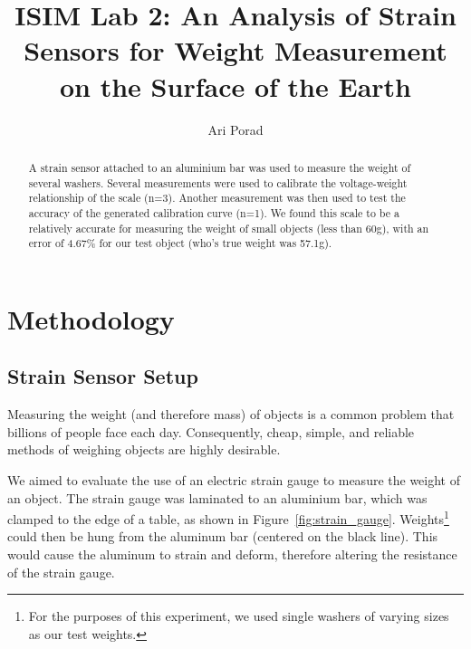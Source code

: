 \documentclass[11pt]{article}
\begin{document}
\title{ISIM Lab 2: An Analysis of Strain Sensors for Weight Measurement on the Surface of the Earth}
\author{Ari Porad}
\maketitle %

\begin{abstract}
    A strain sensor attached to an aluminium bar was used to measure the weight of several washers. Several measurements were used to calibrate the voltage-weight relationship of the scale (n=3). Another measurement was then used to test the accuracy of the generated calibration curve (n=1). We found this scale to be a relatively accurate for measuring the weight of small objects (less than 60g), with an error of 4.67\% for our test object (who's true weight was 57.1g).
\end{abstract}

\section{Methodology}

\subsection{Strain Sensor Setup}

Measuring the weight (and therefore mass) of objects is a common problem that billions of people face each day. Consequently, cheap, simple, and reliable methods of weighing objects are highly desirable.

We aimed to evaluate the use of an electric strain gauge to measure the weight of an object. The strain gauge was laminated to an aluminium bar, which was clamped to the edge of a table, as shown in Figure~\ref{fig:strain_gauge}. Weights\footnote{For the purposes of this experiment, we used single washers of varying sizes as our test weights.} could then be hung from the aluminum bar (centered on the black line). This would cause the aluminum to strain and deform, therefore altering the resistance of the strain gauge.
\end{document}
